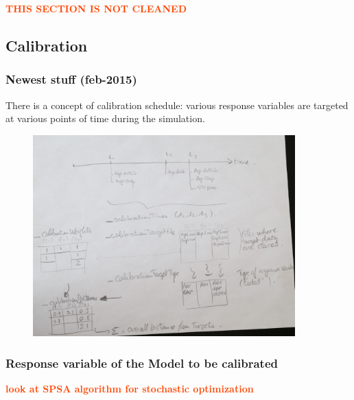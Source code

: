 \documentclass[11pt, onecolumn]{article}
\newcommand{\warning}[1]{\textbf{\textcolor{OrangeRed}{#1}}}
\begin{document}
\warning{THIS SECTION IS NOT CLEANED}

\subsection{Calibration}

\subsubsection{Newest stuff (feb-2015)}

There is a concept of calibration schedule: various response variables are targeted at various points of time during the simulation.


\begin{figure}[!ht]
\centering
    \includegraphics[angle=0,width=0.9\textwidth]{calibration_schedule.jpg}
\end{figure}


\subsubsection{Response variable of the Model to be calibrated}

\warning{look at SPSA algorithm for stochastic optimization}
\end{document}
